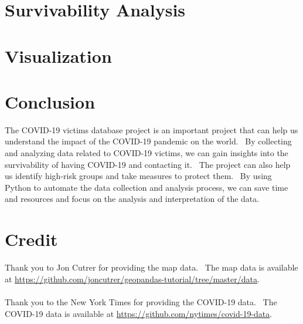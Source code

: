\documentclass{article}
\begin{document}
\section{Survivability Analysis}


\section{Visualization}

\section{Conclusion}
The COVID-19 victims database project is an important project that can help us understand the impact of the COVID-19 pandemic on the world. \
By collecting and analyzing data related to COVID-19 victims, we can gain insights into the survivability of having COVID-19 and contacting it. \
The project can also help us identify high-risk groups and take measures to protect them. \
By using Python to automate the data collection and analysis process, we can save time and resources and focus on the analysis and interpretation of the data.

\section{Credit}
Thank you to Jon Cutrer for providing the map data. \
The map data is available at \url{https://github.com/joncutrer/geopandas-tutorial/tree/master/data}.
\\\\
Thank you to the New York Times for providing the COVID-19 data. \
The COVID-19 data is available at \url{https://github.com/nytimes/covid-19-data}.
\end{document}

